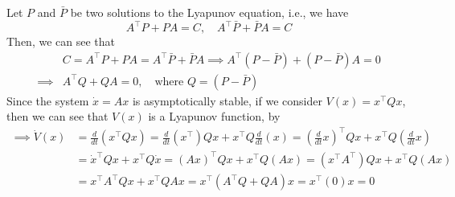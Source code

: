 Let \( P \) and \( \bar{P} \) be two solutions to the Lyapunov equation, i.e., we have
\begin{equation*}
    A^\top P + P A = C,
    \quad
    A^\top \bar{P} + \bar{P} A = C
\end{equation*}
Then, we can see that
\begin{align*}
     &
    C
    =
    A^\top P + P A
    =
    A^\top \bar{P} + \bar{P} A
    \implies
    A^\top (P - \bar{P}) + (P - \bar{P}) A
    =
    0
    \\
    \implies
     &
    A^\top Q + Q A
    =
    0,
    \quad \text{where } Q = (P - \bar{P})
\end{align*}
Since the system \( \dot x = A x \) is asymptotically stable, if we consider \( V(x) = x^\top Q x \), then we can see that \( V(x) \) is a Lyapunov function, by
\begin{align*}
    \implies
    \dot V(x)
     & =
    \frac{d}{dt} \left( x^\top Q x \right)
    =
    \frac{d}{dt} \left( x^\top \right) Q x + x^\top Q \frac{d}{dt} \left( x \right)
    =
    {\left(\frac{d}{dt} x \right)}^\top Q x + x^\top Q {\left(\frac{d}{dt} x \right)}
    \\ & =
    {\dot x}^\top Q x + x^\top Q \dot x
    =
    {\left( A x \right)}^\top Q x + x^\top Q \left( A x \right)
    =
    \left( x^\top A^\top \right) Q x + x^\top Q \left( A x \right)
    \\ & =
    x^\top A^\top Q x + x^\top Q A x
    =
    x^\top \left( A^\top Q + Q A \right) x
    =
    x^\top \left( 0 \right) x
    =
    0
\end{align*}

